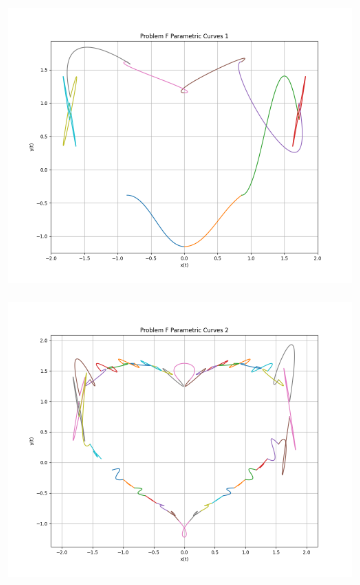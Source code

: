 \documentclass[a4paper]{article}
\begin{document}
\begin{figure}[h]
    \centering
    \begin{subfigure}[b]{0.45\textwidth}
        \includegraphics[width=\textwidth]{Pictures/ProblemF_1.png}
        \label{fig:ProblemF1}
    \end{subfigure}
    \hfill
    \begin{subfigure}[b]{0.45\textwidth}
        \includegraphics[width=\textwidth]{Pictures/ProblemF_2.png}
        \label{fig:ProblemF2}
    \end{subfigure}

\end{figure}
\end{document}
